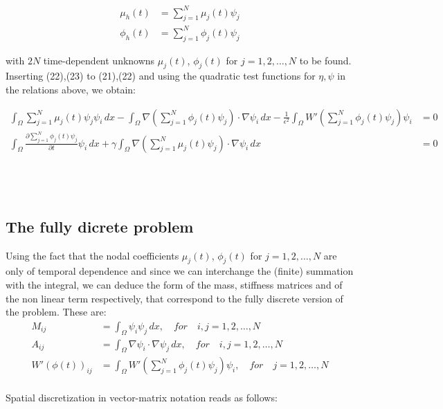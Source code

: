 \documentclass{article}
\begin{document}
\begin{align}
\mu_h(t) &= \sum_{j=1}^N \mu_j(t) \psi_j \\
\phi_h(t) &= \sum_{j=1}^N \phi_j(t) \psi_j
\end{align}

with $2N$ time-dependent unknowns $\mu_j(t)$, $\phi_j(t)$ for $j = 1, 2, \ldots, N$ to be found.\\


Inserting (22),(23) to (21),(22) and using the quadratic test functions for $\eta,\psi$ in the relations above, we obtain:

\begin{align}
\int_\Omega \sum_{j=1}^N \mu_j(t) \psi_j\psi_i \, dx -\int_\Omega \nabla(\sum_{j=1}^N \phi_j(t) \psi_j)\cdot \nabla\psi_i \, dx - \frac{1}{\epsilon^2}\int_\Omega  W'(\sum_{j=1}^N \phi_j(t) \psi_j)\psi_i
&= 0\\ 
\int_\Omega\frac{\partial \sum_{j=1}^N \phi_j(t) \psi_j}{\partial t} \psi_i \, dx + \gamma\int_\Omega \nabla (\sum_{j=1}^N \mu_j(t) \psi_j) \cdot \nabla \psi_i \, dx &= 0 
\end{align} \\\\\\


\subsection{The fully dicrete problem}
Using the fact that the nodal coefficients $\mu_j(t)$, $\phi_j(t)$ for $j = 1, 2, \ldots, N$ are only of temporal dependence and since we can interchange the (finite) summation with the integral, we can deduce the form of the mass, stiffness matrices and of the non linear term respectively, that correspond to the fully discrete version of the problem. These are:\\

\begin{align}
M_{ij} &= \int_{\Omega} \psi_i\psi_j \, dx, \quad for \quad i, j = 1, 2, \ldots, N \\
A_{ij} &= \int_{\Omega} \nabla \psi_i\cdot\nabla \psi_j \, dx, \quad for \quad i, j = 1, 2, \ldots, N \\
W'(\phi(t))_{ij} &= \int_\Omega  W'(\sum_{j=1}^N \phi_j(t) \psi_j)\psi_i,\quad for \quad j = 1, 2, \ldots, N
\end{align}\\


Spatial discretization in vector-matrix notation reads as follows:\\
\end{document}
